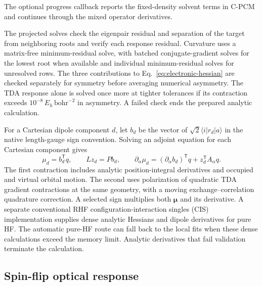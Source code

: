 The optional progress callback reports the fixed-density solvent terms in
C-PCM and continues through the mixed operator derivatives.

The projected solves check the eigenpair residual and separation of
the target from neighboring roots and verify each response residual.
Curvature uses a matrix-free minimum-residual solve, with batched
conjugate-gradient solves for the lowest root when available and
individual minimum-residual solves for unresolved rows. The three
contributions to Eq.~\eqref{eq:electronic-hessian} are checked separately
for symmetry before averaging numerical asymmetry. The TDA response
alone is solved once more at tighter tolerances if its contraction
exceeds $10^{-8}\,E_h\,\mathrm{bohr}^{-2}$ in asymmetry. A failed
check ends the prepared analytic calculation.

For a Cartesian dipole component $d$, let $b_d$ be the vector of
$\sqrt{2}\langle i|r_d|a\rangle$ in the native length-gauge sign
convention. Solving an adjoint equation for each Cartesian component gives
\begin{equation}
 \mu_d=b_d^{\mathsf T}q, \qquad
 L z_d=P b_d, \qquad
 \partial_\alpha\mu_d
 =(\partial_\alpha b_d)^{\mathsf T}q+z_d^{\mathsf T} A_\alpha q.
 \label{eq:electronic-dipole}
\end{equation}
The first contraction includes analytic position-integral derivatives
and occupied and virtual orbital motion. The second uses polarization
of quadratic TDA gradient contractions at the same geometry, with a
moving exchange--correlation quadrature correction. A selected sign
multiplies both $\boldsymbol\mu$ and its derivative. A separate
conventional RHF configuration-interaction singles (CIS) implementation
supplies dense analytic Hessians and dipole derivatives for pure HF.
The automatic pure-HF route can fall back to the local fits when these
dense calculations exceed the memory limit. Analytic derivatives
that fail validation terminate the calculation.

\subsection{Spin-flip optical response}

